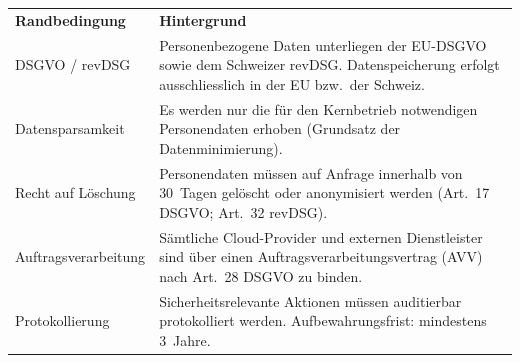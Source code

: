 \begin{tabularx}{\textwidth}{L{3.2cm} X}
  \color{white}\textbf{Randbedingung} &
  \color{white}\textbf{Hintergrund} \\

  DSGVO / revDSG &
  Personenbezogene Daten unterliegen der EU-DSGVO sowie
  dem Schweizer revDSG. Datenspeicherung erfolgt
  ausschliesslich in der EU bzw.\ der Schweiz. \\

  Datensparsamkeit &
  Es werden nur die für den Kernbetrieb notwendigen
  Personendaten erhoben (Grundsatz der
  Datenminimierung). \\

  Recht auf Löschung &
  Personendaten müssen auf Anfrage innerhalb von
  30~Tagen gelöscht oder anonymisiert werden
  (Art.~17 DSGVO; Art.~32 revDSG). \\

  Auftragsverarbeitung &
  Sämtliche Cloud-Provider und externen Dienstleister
  sind über einen Auftragsverarbeitungsvertrag (AVV)
  nach Art.~28 DSGVO zu binden. \\

  Protokollierung &
  Sicherheitsrelevante Aktionen müssen auditierbar
  protokolliert werden. Aufbewahrungsfrist: mindestens
  3~Jahre. \\
\end{tabularx}

